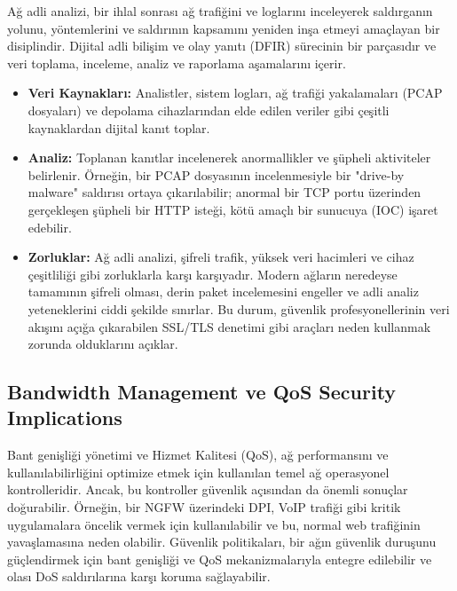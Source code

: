 Ağ adli analizi, bir ihlal sonrası ağ trafiğini ve loglarını inceleyerek saldırganın yolunu, yöntemlerini ve saldırının kapsamını yeniden inşa etmeyi amaçlayan bir disiplindir. Dijital adli bilişim ve olay yanıtı (DFIR) sürecinin bir parçasıdır ve veri toplama, inceleme, analiz ve raporlama aşamalarını içerir.

\begin{itemize}
\item \textbf{Veri Kaynakları:} Analistler, sistem logları, ağ trafiği yakalamaları (PCAP dosyaları) ve depolama cihazlarından elde edilen veriler gibi çeşitli kaynaklardan dijital kanıt toplar.
\item \textbf{Analiz:} Toplanan kanıtlar incelenerek anormallikler ve şüpheli aktiviteler belirlenir. Örneğin, bir PCAP dosyasının incelenmesiyle bir "drive-by malware" saldırısı ortaya çıkarılabilir; anormal bir TCP portu üzerinden gerçekleşen şüpheli bir HTTP isteği, kötü amaçlı bir sunucuya (IOC) işaret edebilir.
\item \textbf{Zorluklar:} Ağ adli analizi, şifreli trafik, yüksek veri hacimleri ve cihaz çeşitliliği gibi zorluklarla karşı karşıyadır. Modern ağların neredeyse tamamının şifreli olması, derin paket incelemesini engeller ve adli analiz yeteneklerini ciddi şekilde sınırlar. Bu durum, güvenlik profesyonellerinin veri akışını açığa çıkarabilen SSL/TLS denetimi gibi araçları neden kullanmak zorunda olduklarını açıklar.
\end{itemize}

\subsection{Bandwidth Management ve QoS Security Implications}

Bant genişliği yönetimi ve Hizmet Kalitesi (QoS), ağ performansını ve kullanılabilirliğini optimize etmek için kullanılan temel ağ operasyonel kontrolleridir. Ancak, bu kontroller güvenlik açısından da önemli sonuçlar doğurabilir. Örneğin, bir NGFW üzerindeki DPI, VoIP trafiği gibi kritik uygulamalara öncelik vermek için kullanılabilir ve bu, normal web trafiğinin yavaşlamasına neden olabilir. Güvenlik politikaları, bir ağın güvenlik duruşunu güçlendirmek için bant genişliği ve QoS mekanizmalarıyla entegre edilebilir ve olası DoS saldırılarına karşı koruma sağlayabilir.
